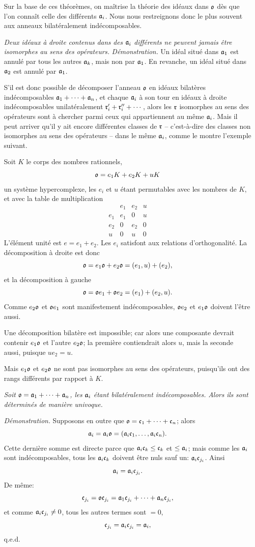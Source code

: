Sur la base de ces théorèmes, on maîtrise la théorie des idéaux dans $\mathfrak{o}$ dès que l'on connaît celle des différents $\mathfrak{a}_i$. Nous nous restreignons donc le plus souvent aux anneaux bilatéralement indécomposables.

\emph{Deux idéaux à droite contenus dans des $\mathfrak{a}_i$ différents ne peuvent jamais être isomorphes au sens des opérateurs.}
\emph{Démonstration.} Un idéal situé dans $\mathfrak{a}_1$ est annulé par tous les autres $\mathfrak{a}_k$, mais non par $\mathfrak{a}_1$. En revanche, un idéal situé dans $\mathfrak{a}_2$ est annulé par $\mathfrak{a}_1$.

S'il est donc possible de décomposer l'anneau $\mathfrak{o}$ en idéaux bilatères indécomposables $\mathfrak{a}_1+\cdots+\mathfrak{a}_n$, et chaque $\mathfrak{a}_i$ à son tour en idéaux à droite indécomposables unilatéralement $\mathfrak{r}_i'+\mathfrak{r}_i''+\cdots$, alors les $\mathfrak{r}$ isomorphes au sens des opérateurs sont à chercher parmi ceux qui appartiennent au même $\mathfrak{a}_i$. Mais il peut arriver qu'il y ait encore différentes classes de $\mathfrak{r}$ -- c'est-à-dire des classes non isomorphes au sens des opérateurs -- dans le même $\mathfrak{a}_i$, comme le montre l'exemple suivant.

Soit $K$ le corps des nombres rationnels,
\[
        \mathfrak{o}=e_1K+e_2K+uK
\]
un système hypercomplexe, les $e_i$ et $u$ étant permutables avec les nombres de $K$, et avec la table de multiplication
\[
\begin{array}{c|ccc}
     & e_1&e_2&u\\ \hline
 e_1 & e_1&0&u\\
 e_2 & 0&e_2&0\\
 u   & 0&u&0
\end{array}
\]
L'élément unité est $e=e_1+e_2$. Les $e_i$ satisfont aux relations d'orthogonalité. La décomposition à droite est donc
\[
        \mathfrak{o}=e_1\mathfrak{o}+e_2\mathfrak{o}=(e_1,u)+(e_2),
\]
et la décomposition à gauche
\[
        \mathfrak{o}=\mathfrak{o} e_1+\mathfrak{o} e_2=(e_1)+(e_2,u).
\]
Comme $e_2\mathfrak{o}$ et $\mathfrak{o} e_1$ sont manifestement indécomposables, $\mathfrak{o} e_2$ et $e_1\mathfrak{o}$ doivent l'être aussi.

Une décomposition bilatère est impossible; car alors une composante devrait contenir $e_1\mathfrak{o}$ et l'autre $e_2\mathfrak{o}$; la première contiendrait alors $u$, mais la seconde aussi, puisque $ue_2=u$.

Mais $e_1\mathfrak{o}$ et $e_2\mathfrak{o}$ ne sont pas isomorphes au sens des opérateurs, puisqu'ils ont des rangs différents par rapport à $K$.

\emph{Soit $\mathfrak{o}=\mathfrak{a}_1+\cdots+\mathfrak{a}_n$, les $\mathfrak{a}_i$ étant bilatéralement indécomposables. Alors ils sont déterminés de manière univoque.}

\emph{Démonstration.} Supposons en outre que $\mathfrak{o}=\mathfrak{c}_1+\cdots+\mathfrak{c}_n$; alors
\[
        \mathfrak{a}_i=\mathfrak{a}_i\mathfrak{o}=(\mathfrak{a}_i\mathfrak{c}_1,\ldots,\mathfrak{a}_i\mathfrak{c}_n).
\]
Cette dernière somme est directe parce que $\mathfrak{a}_i\mathfrak{c}_k\leq\mathfrak{c}_k$ et $\leq\mathfrak{a}_i$; mais comme les $\mathfrak{a}_i$ sont indécomposables, tous les $\mathfrak{a}_i\mathfrak{c}_k$ doivent être nuls sauf un: $\mathfrak{a}_i\mathfrak{c}_{j_i}$. Ainsi
\[
        \mathfrak{a}_i=\mathfrak{a}_i\mathfrak{c}_{j_i}.
\]
De même:
\[
        \mathfrak{c}_{j_i}=\mathfrak{o}\mathfrak{c}_{j_i}=\mathfrak{a}_1\mathfrak{c}_{j_i}+\cdots+\mathfrak{a}_n\mathfrak{c}_{j_i},
\]
et comme $\mathfrak{a}_i\mathfrak{c}_{j_i}\ne0$, tous les autres termes sont $=0$,
\[
        \mathfrak{c}_{j_i}=\mathfrak{a}_i\mathfrak{c}_{j_i}=\mathfrak{a}_i,
\]
q.e.d.
